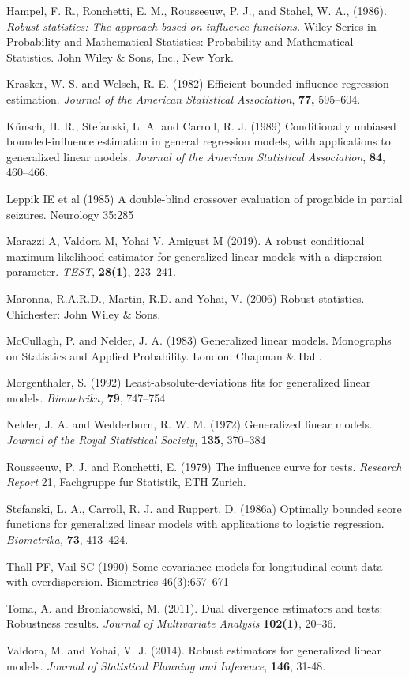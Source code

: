 \documentclass[a4paper]{article}%
\begin{document}
\begin{thebibliography}{99}
Hampel, F. R., Ronchetti, E. M., Rousseeuw, P. J., and Stahel, W.
A., (1986). \textit{Robust statistics: The approach based on influence
functions.} Wiley Series in Probability and Mathematical Statistics:
Probability and Mathematical Statistics. John Wiley \& Sons, Inc., New York.



Krasker, W. S. and Welsch, R. E. (1982) Efficient
bounded-influence regression estimation. \textit{Journal of the American
Statistical Association}, \textbf{77, } 595--604.

K\"{u}nsch, H. R., Stefanski, L. A. and Carroll, R. J. (1989)
Conditionally unbiased bounded-influence estimation in general regression
models, with applications to generalized linear models. \textit{Journal of the
American Statistical Association}, \textbf{84}, 460--466.


Leppik IE et al (1985) A double-blind crossover evaluation of progabide in partial seizures. Neurology
35:285


Marazzi A, Valdora M, Yohai V, Amiguet M (2019). A robust conditional maximum likelihood
estimator for generalized linear models with a dispersion parameter. \textit{TEST}, \textbf{28(1)}, 223--241.


 Maronna, R.A.R.D., Martin, R.D. and Yohai, V. (2006) Robust statistics. Chichester: John Wiley \& Sons. 


McCullagh, P. and Nelder, J. A. (1983) Generalized linear models.
Monographs on Statistics and Applied Probability. London: Chapman \& Hall. 

Morgenthaler, S. (1992) Least-absolute-deviations fits for
generalized linear models. \textit{Biometrika,} \textbf{79}, 747--754

Nelder, J. A. and Wedderburn, R. W. M. (1972) Generalized linear
models. \textit{Journal of the Royal Statistical Society}, \textbf{135}, 370--384

Rousseeuw, P. J. and Ronchetti, E. (1979) The influence curve for
tests. \textit{Research Report} 21, Fachgruppe fur Statistik, ETH Zurich.

Stefanski, L. A., Carroll, R. J. and Ruppert, D. (1986a)
Optimally bounded score functions for generalized linear models with
applications to logistic regression. \textit{Biometrika, }\textbf{73}, 413--424.

Thall PF, Vail SC (1990) Some covariance models for longitudinal count data with overdispersion. Biometrics
46(3):657–671


Toma, A. and Broniatowski, M. (2011). Dual divergence estimators
and tests: Robustness results. \textit{Journal of Multivariate Analysis}
\textbf{102(1)}, 20--36.

Valdora, M. and Yohai, V. J. (2014). Robust estimators for
generalized linear models. \textit{Journal of Statistical Planning and
Inference}, \textbf{146}, 31-48.
\end{thebibliography}
\end{document}
